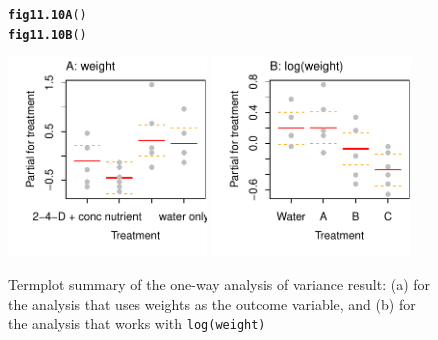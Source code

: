 \documentclass[12pt, a4paper,  BCOR=8.25mm, DIV=15]{scrartcl}\usepackage[]{graphicx}\usepackage[]{color}
\makeatletter
\newcommand{\hlstd}[1]{\textcolor[rgb]{0.345,0.345,0.345}{#1}}%
\newcommand{\hlkwd}[1]{\textcolor[rgb]{0.737,0.353,0.396}{\textbf{#1}}}%
\newenvironment{kframe}{%
 \def\at@end@of@kframe{}%
 \ifinner\ifhmode%
  \def\at@end@of@kframe{\end{minipage}}%
  \begin{minipage}{\columnwidth}%
 \fi\fi%
 \def\FrameCommand##1{\hskip\@totalleftmargin \hskip-\fboxsep
 \colorbox{shadecolor}{##1}\hskip-\fboxsep
     \hskip-\linewidth \hskip-\@totalleftmargin \hskip\columnwidth}%
 \MakeFramed {\advance\hsize-\width
   \@totalleftmargin\z@ \linewidth\hsize
   \@setminipage}}%
 {\par\unskip\endMakeFramed%
 \at@end@of@kframe}
\newenvironment{knitrout}{}{} %
\newcommand{\txtt}[1]{{\texttt{#1}}}
\makeatother
\begin{document}
\begin{figure}[H]
\begin{knitrout}
\color{fgcolor}\begin{kframe}
\begin{alltt}
\hlkwd{fig11.10A}\hlstd{()}
\hlkwd{fig11.10B}\hlstd{()}
\end{alltt}
\end{kframe}

{\centering \includegraphics[width=0.47\textwidth]{figs/reg-tomato-11-10e-1} 
\includegraphics[width=0.47\textwidth]{figs/reg-tomato-11-10e-2} 

}



\end{knitrout}
 \caption{Termplot summary of the one-way analysis of variance result:
(a) for the analysis that uses weights as the outcome variable, and
(b) for the analysis that works with \txtt{log(weight)}}
\label{fig:tomatoterm}
\end{figure}
\end{document}
